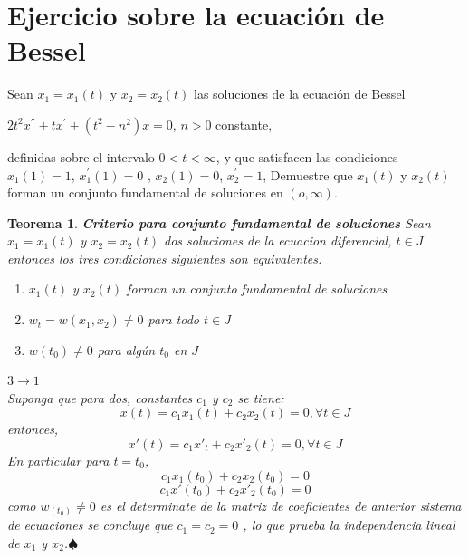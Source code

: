 \documentclass{article}
\newcounter{Teorema}
\numberwithin{equation}{section}
\theoremstyle{plain}  %
\newtheorem{thm}{Teorema}[section]
\begin{document}
\section{Ejercicio sobre la ecuación de Bessel}
Sean $x_{1}=x_{1}(t)$ y $x_{2}=x_{2}(t)$ 
las soluciones de la ecuación de Bessel
\begin{center}
    $2t^{2}x^{''}+tx^{'}+(t^{2}-n^{2})x=0$, $n>0$ constante,
\end{center}
definidas sobre el intervalo $0<t<\infty$, y que satisfacen las condiciones 
$x_{1}(1)=1 $, $x_{1}^{'}(1)=0$ , $x_{2}(1)=0$, $x_{2}^{'}=1$, Demuestre 
que $x_{1}(t)$ y $x_{2}(t)$ forman un conjunto fundamental de soluciones en 
$(o, \infty)$.
\begin{thm}
\textbf{Criterio para conjunto fundamental de soluciones} 
Sean $x_{1}=x_{1}(t)$ y $x_{2}=x_{2}(t)$ dos soluciones de la ecuacion diferencial, $t\in J$ entonces los tres condiciones siguientes son equivalentes. 
\begin{enumerate}
    \item $x_{1}(t)$ y $x_{2}(t)$ forman un conjunto fundamental de soluciones 
    \item $w_{t}=w(x_{1},x_{2}) \not = 0$ para todo $t \in J$
    \item $w(t_{0}) \not = 0 $ para algún $t_{0}$ en $J$
\end{enumerate} 
\textbf{$3 \to 1$} \\
Suponga que para dos, constantes $c_{1}$ y $c_{2}$ se tiene:
\begin{equation*}
    x(t) = c_{1}x_{1}(t) + c_{2}x_{2}(t) = 0, \forall t \in J
\end{equation*}
entonces, 
\begin{equation*}
    x'(t) = c_{1}x'_{t} + c_{2}x'_{2}(t) = 0, \forall t \in J
\end{equation*}
En particular para $t = t_{0}$, 
\begin{equation*}
    c_{1}x_{1}(t_{0}) + c_{2}x_{2}(t_{0}) = 0
\end{equation*}
\begin{equation*}
    c_{1}x'(t_{0}) + c_{2}x'_{2}(t_{0}) = 0 
\end{equation*}
como $w_(t_{0}) \not = 0$ es el determinate de la matriz de coeficientes de anterior 
sistema de ecuaciones se concluye que $c_{1} = c_{2} = 0$ , lo que prueba la independencia 
lineal de $x_{1}$ y $x_{2}$.$\spadesuit$
\end{thm}
\end{document}
